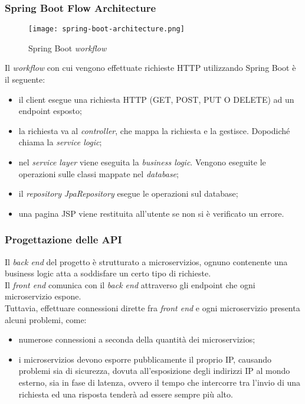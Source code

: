 \subsubsection{Spring Boot Flow Architecture}
\begin{figure}[H] 
    \centering 
    \texttt{[image: spring-boot-architecture.png]} 
    \caption{Spring Boot \textit{workflow}}
\end{figure}
Il \textit{workflow} con cui vengono effettuate richieste HTTP utilizzando Spring Boot è il seguente:
\begin{itemize}
    \item il client esegue una richiesta HTTP (GET, POST, PUT O DELETE) ad un   \gls{endpoint} esposto;
    \item la richiesta va al \textit{controller}, che mappa la richiesta e la gestisce. Dopodiché chiama la \textit{service logic};
    \item nel \textit{service layer} viene eseguita la \textit{business logic}. Vengono eseguite le operazioni sulle classi mappate nel \textit{database};
    \item il \textit{repository} \textit{JpaRepository} esegue le operazioni sul database;
    \item una pagina \gls{JSP} viene restituita all'utente se non si è verificato un errore.
\end{itemize} 


\subsubsection{Progettazione delle API}
Il \textit{back end} del progetto è strutturato a \glspl{microservizio}, ognuno contenente una business logic atta a soddisfare un certo tipo di richieste.\\
Il \textit{front end} comunica con il \textit{back end} attraverso gli \gls{endpoint} che ogni \gls{microservizio} espone. \\
Tuttavia, effettuare connessioni dirette fra \textit{front end} e ogni \gls{microservizio} presenta alcuni problemi, come: 
\begin{itemize}
    \item numerose connessioni a seconda della quantità dei \glspl{microservizio};
    \item i \glspl{microservizio} devono esporre pubblicamente il proprio \gls{IP}, causando problemi sia di sicurezza, dovuta all'esposizione degli indirizzi IP al mondo esterno, sia in fase di latenza, ovvero il tempo che intercorre tra l'invio di una richiesta ed una risposta tenderà ad essere
    sempre più alto.
\end{itemize}

